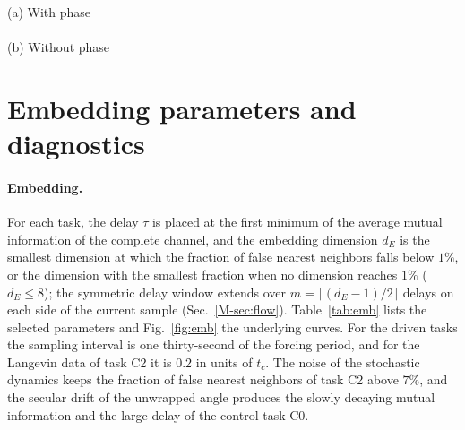 \documentclass[10pt,letterpaper]{article}
\newcommand{\mref}[1]{\ref{M-#1}}
\begin{document}
\begin{table}[!htbp]
\caption{Task C3: spring force $s$ reconstructed from the complete collar height $c$ on the chaotic attractor, (a) with the forcing phase in the conditioning vector, which is also appended to the input of the original FPRM, and (b) without it.}
\label{tab:C3}
\centering\footnotesize\setlength{\tabcolsep}{5pt}
(a) With phase\\[2pt]
\\[8pt]
(b) Without phase\\[2pt]

\end{table}

\begin{table}[!htbp]
\caption{Control task C0: angular velocity reconstructed from the complete, unwrapped angle (Sec.~\mref{sec:res_c0}). The Savitzky--Golay derivative (window of 11 samples, degree 4) is a point estimate, for which the coverage is undefined and the CRPS reduces to the mean absolute error.}
\label{tab:C0}
\centering\footnotesize\setlength{\tabcolsep}{5pt}

\end{table}

\clearpage
\section{Embedding parameters and diagnostics}\label{sec:diag}

\paragraph{Embedding.} For each task, the delay $\tau$ is placed at the first minimum of the average mutual information of the complete channel, and the embedding dimension $d_E$ is the smallest dimension at which the fraction of false nearest neighbors falls below $1\%$, or the dimension with the smallest fraction when no dimension reaches $1\%$ ($d_E\le8$); the symmetric delay window extends over $m=\lceil(d_E-1)/2\rceil$ delays on each side of the current sample (Sec.~\mref{sec:flow}). Table~\ref{tab:emb} lists the selected parameters and Fig.~\ref{fig:emb} the underlying curves. For the driven tasks the sampling interval is one thirty-second of the forcing period, and for the Langevin data of task C2 it is $0.2$ in units of $t_c$. The noise of the stochastic dynamics keeps the fraction of false nearest neighbors of task C2 above $7\%$, and the secular drift of the unwrapped angle produces the slowly decaying mutual information and the large delay of the control task C0.
\end{document}
